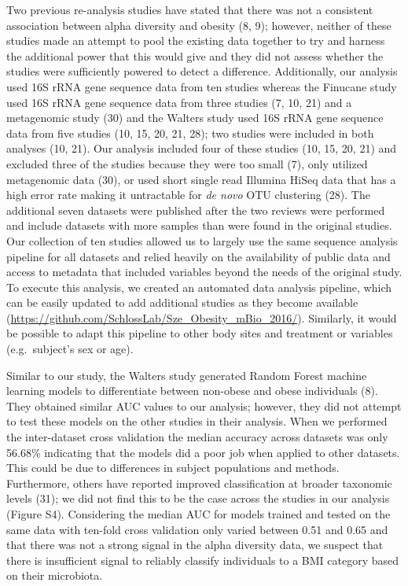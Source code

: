\documentclass[12pt,]{article}
\begin{document}
Two previous re-analysis studies have stated that there was not a
consistent association between alpha diversity and obesity (8, 9);
however, neither of these studies made an attempt to pool the existing
data together to try and harness the additional power that this would
give and they did not assess whether the studies were sufficiently
powered to detect a difference. Additionally, our analysis used 16S rRNA
gene sequence data from ten studies whereas the Finucane study used 16S
rRNA gene sequence data from three studies (7, 10, 21) and a metagenomic
study (30) and the Walters study used 16S rRNA gene sequence data from
five studies (10, 15, 20, 21, 28); two studies were included in both
analyses (10, 21). Our analysis included four of these studies (10, 15,
20, 21) and excluded three of the studies because they were too small
(7), only utilized metagenomic data (30), or used short single read
Illumina HiSeq data that has a high error rate making it untractable for
\emph{de novo} OTU clustering (28). The additional seven datasets were
published after the two reviews were performed and include datasets with
more samples than were found in the original studies. Our collection of
ten studies allowed us to largely use the same sequence analysis
pipeline for all datasets and relied heavily on the availability of
public data and access to metadata that included variables beyond the
needs of the original study. To execute this analysis, we created an
automated data analysis pipeline, which can be easily updated to add
additional studies as they become available
(\url{https://github.com/SchlossLab/Sze_Obesity_mBio_2016/}). Similarly,
it would be possible to adapt this pipeline to other body sites and
treatment or variables (e.g.~subject's sex or age).

Similar to our study, the Walters study generated Random Forest machine
learning models to differentiate between non-obese and obese individuals
(8). They obtained similar AUC values to our analysis; however, they did
not attempt to test these models on the other studies in their analysis.
When we performed the inter-dataset cross validation the median accuracy
across datasets was only 56.68\% indicating that the models did a poor
job when applied to other datasets. This could be due to differences in
subject populations and methods. Furthermore, others have reported
improved classification at broader taxonomic levels (31); we did not
find this to be the case across the studies in our analysis (Figure S4).
Considering the median AUC for models trained and tested on the same
data with ten-fold cross validation only varied between 0.51 and 0.65
and that there was not a strong signal in the alpha diversity data, we
suspect that there is insufficient signal to reliably classify
individuals to a BMI category based on their microbiota.
\end{document}
